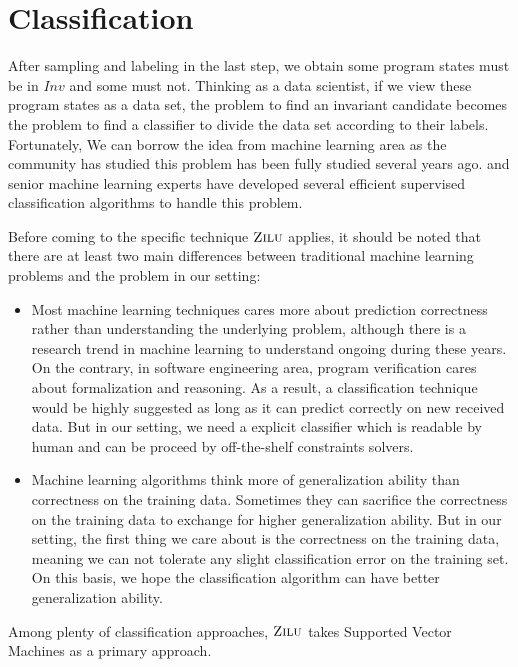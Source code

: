 
\section{Classification} %
\label{sec:classification}

After sampling and labeling in the last step, we obtain some program states must be in $Inv$ and some must not. 
Thinking as a data scientist, if we view these program states as a data set, 
the problem to find an invariant candidate becomes the problem to find a classifier to divide the data set according to their labels.
Fortunately, We can borrow the idea from machine learning area as the community has studied this problem has been fully studied several years ago.
and senior machine learning experts have developed several efficient supervised classification algorithms to handle this problem.

Before coming to the specific technique $\textsc{Zilu}$ applies,
it should be noted that there are at least two main differences between traditional machine learning problems and the problem in our setting:
\begin{itemize}
\item Most machine learning techniques cares more about prediction correctness rather than understanding the underlying problem,
although there is a research trend in machine learning to understand ongoing during these years.
On the contrary, in software engineering area, program verification cares about formalization and reasoning.
As a result, a classification technique would be highly suggested as long as it can predict correctly on new received data.
But in our setting, we need a explicit classifier which is readable by human and can be proceed by off-the-shelf constraints solvers.
\item Machine learning algorithms think more of generalization ability than correctness on the training data.
Sometimes they can sacrifice the correctness on the training data to exchange for higher generalization ability.
But in our setting, the first thing we care about is the correctness on the training data,
meaning we can not tolerate any slight classification error on the training set.
On this basis, we hope the classification algorithm can have better generalization ability.
\end{itemize} 

Among plenty of classification approaches, $\textsc{Zilu}$ takes Supported Vector Machines as a primary approach.

